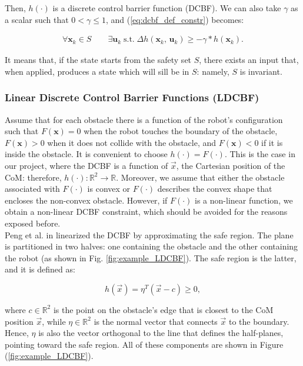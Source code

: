 Then, $h(\cdot)$ is a discrete control barrier function (DCBF). We can also take $\gamma$ as a scalar such that $0 < \gamma \leq 1$, and (\ref{eq:dcbf_def_constr}) becomes:

\begin{gather*}
    \forall \mathbf{x}_k \in S \qquad \exists \mathbf{u}_k \; \text{s.t.} \; \Delta h(\mathbf{x}_k,\, \mathbf{u}_k) \geq -\gamma * h(\mathbf{x}_k). 
\end{gather*}

It means that, if the state starts from the safety set $S$, there exists an input that, when applied, produces a state which will sill be in $S$: namely, $S$ is invariant. 

\subsubsection{Linear Discrete Control Barrier Functions (LDCBF)}\label{subsec:ldcbf}
Assume that for each obstacle there is a function of the robot's configuration such that $F(\mathbf{x})=0$ when the robot touches the boundary of the obstacle, $F(\mathbf{x})>0$ when it does not collide with the obstacle, and $F(\mathbf{x})<0$ if it is inside the obstacle. It is convenient to choose $h(\cdot)=F(\cdot)$. This is the case in our project, where the DCBF is a function of $\vec{x}$, the Cartesian position of the CoM: therefore, $h(\cdot)\colon \mathbb{R}^2 \rightarrow \mathbb{R}$. Moreover, we assume that either the obstacle associated with $F(\cdot)$ is convex or $F(\cdot)$ describes the convex shape that encloses the non-convex obstacle.
However, if $F(\cdot)$ is a non-linear function, we obtain a non-linear DCBF constraint, which should be avoided for the reasons exposed before.\\
Peng et al. in \cite{peng_main_paper} linearized the DCBF by approximating the safe region. The plane is partitioned in two halves: one containing the obstacle and the other containing the robot (as shown in Fig. \ref{fig:example_LDCBF}).
The safe region is the latter, and it is defined as:

\begin{equation} \label{eq:std_ldcbf_def}
h\left(\vec{x}\right) = \eta^T \left(\vec{x} - c\right) \geq 0,
\end{equation}

where $c \in \mathbb{R}^2$ is the point on the obstacle's edge that is closest to the CoM position $\vec{x}$, while $\eta \in \mathbb{R}^2$ is the normal vector that connects $\vec{x}$ to the boundary. Hence, $\eta$ is also the vector orthogonal to the line that defines the half-planes, pointing toward the safe region. All of these components are shown in Figure (\ref{fig:example_LDCBF}).\\

